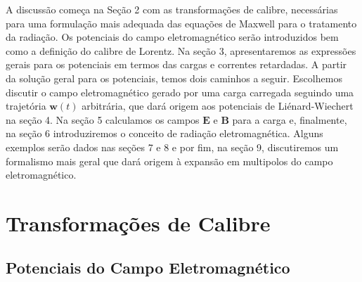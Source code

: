 \documentclass{article}
\begin{document}
A discussão começa na Seção 2 com as transformações de calibre, necessárias para uma formulação mais adequada das equações de Maxwell para o tratamento da radiação. Os potenciais do campo eletromagnético serão introduzidos bem como a definição do calibre de Lorentz. Na seção 3, apresentaremos as expressões gerais para os potenciais em termos das cargas e correntes retardadas. A partir da solução geral para os potenciais, temos dois caminhos a seguir. Escolhemos discutir o campo eletromagnético gerado por uma carga carregada seguindo uma trajetória $\mathbf{w}(t)$ arbitrária, que dará origem aos potenciais de Liénard-Wiechert na seção 4. Na seção 5 calculamos os campos $\mathbf{E}$ e $\mathbf{B}$ para a carga e, finalmente, na seção 6 introduziremos o conceito de radiação eletromagnética. Alguns exemplos serão dados nas seções 7 e 8 e por fim, na seção 9, discutiremos um formalismo mais geral que dará origem à expansão em multipolos do campo eletromagnético.

\section{Transformações de Calibre}

\subsection{Potenciais do Campo Eletromagnético}
\end{document}
